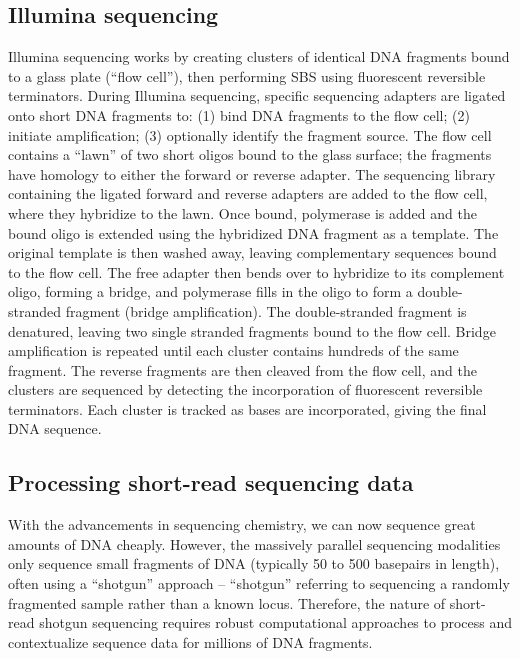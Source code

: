\documentclass[11pt,letterpaper,oneside]{book}
\begin{document}
\hypertarget{illumina}{%
\subsection{Illumina sequencing}\label{illumina}}

Illumina sequencing works by creating clusters of identical DNA fragments bound to a glass plate (``flow cell''), then performing SBS using fluorescent reversible terminators.
During Illumina sequencing, specific sequencing adapters are ligated onto short DNA fragments to: (1) bind DNA fragments to the flow cell; (2) initiate amplification; (3) optionally identify the fragment source.
The flow cell contains a ``lawn'' of two short oligos bound to the glass surface; the fragments have homology to either the forward or reverse adapter.
The sequencing library containing the ligated forward and reverse adapters are added to the flow cell, where they hybridize to the lawn.
Once bound, polymerase is added and the bound oligo is extended using the hybridized DNA fragment as a template.
The original template is then washed away, leaving complementary sequences bound to the flow cell.
The free adapter then bends over to hybridize to its complement oligo, forming a bridge, and polymerase fills in the oligo to form a double-stranded fragment (bridge amplification).
The double-stranded fragment is denatured, leaving two single stranded fragments bound to the flow cell.
Bridge amplification is repeated until each cluster contains hundreds of the same fragment.
The reverse fragments are then cleaved from the flow cell, and the clusters are sequenced by detecting the incorporation of fluorescent reversible terminators.
Each cluster is tracked as bases are incorporated, giving the final DNA sequence.

\hypertarget{seqData}{%
\subsection{Processing short-read sequencing data}\label{seqData}}

With the advancements in sequencing chemistry, we can now sequence great amounts of DNA cheaply.
However, the massively parallel sequencing modalities only sequence small fragments of DNA (typically 50 to 500 basepairs in length), often using a ``shotgun'' approach -- ``shotgun'' referring to sequencing a randomly fragmented sample rather than a known locus.
Therefore, the nature of short-read shotgun sequencing requires robust computational approaches to process and contextualize sequence data for millions of DNA fragments.
\end{document}
